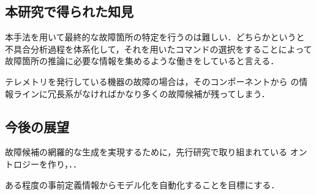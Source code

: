 \documentclass[11pt]{jsarticle}%
\begin{document}
\begin{multicols}{2}
  \subsection{本研究で得られた知見}
  本手法を用いて最終的な故障箇所の特定を行うのは難しい．どちらかというと
  不具合分析過程を体系化して，それを用いたコマンドの選択をすることによって
  故障箇所の推論に必要な情報を集めるような働きをしていると言える．

  テレメトリを発行している機器の故障の場合は，そのコンポーネントから
  の情報ラインに冗長系がなければかなり多くの故障候補が残ってしまう．

  \subsection{今後の展望}

  故障候補の網羅的な生成を実現するために，先行研究で取り組まれている
  オントロジーを作り，．．

  ある程度の事前定義情報からモデル化を自動化することを目標にする．
  


  
   

\end{multicols}
\end{document}
